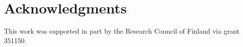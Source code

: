 \documentclass[unnumsec,webpdf,contemporary,large]{oup-authoring-template}%
\theoremstyle{thmstyleone}%
\theoremstyle{thmstyletwo}%
\theoremstyle{thmstylethree}%
\begin{document}
\section{Acknowledgments}
This work was supported in part by the Research Council of Finland via grant 351150.

%
%






%
%
\end{document}
